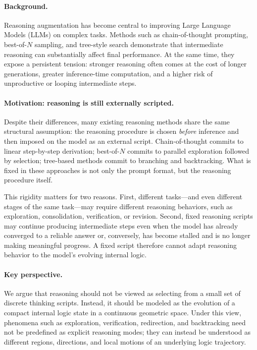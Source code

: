 \documentclass{article}
\begin{document}
\paragraph{Background.}
Reasoning augmentation has become central to improving Large Language Models (LLMs) on complex tasks. Methods such as chain-of-thought prompting, best-of-$N$ sampling, and tree-style search demonstrate that intermediate reasoning can substantially affect final performance. At the same time, they expose a persistent tension: stronger reasoning often comes at the cost of longer generations, greater inference-time computation, and a higher risk of unproductive or looping intermediate steps.

\paragraph{Motivation: reasoning is still externally scripted.}
Despite their differences, many existing reasoning methods share the same structural assumption: the reasoning procedure is chosen \emph{before} inference and then imposed on the model as an external script. Chain-of-thought commits to linear step-by-step derivation; best-of-$N$ commits to parallel exploration followed by selection; tree-based methods commit to branching and backtracking. What is fixed in these approaches is not only the prompt format, but the reasoning procedure itself.

This rigidity matters for two reasons. First, different tasks---and even different stages of the same task---may require different reasoning behaviors, such as exploration, consolidation, verification, or revision. Second, fixed reasoning scripts may continue producing intermediate steps even when the model has already converged to a reliable answer or, conversely, has become stalled and is no longer making meaningful progress. A fixed script therefore cannot adapt reasoning behavior to the model's evolving internal logic.

\paragraph{Key perspective.}
We argue that reasoning should not be viewed as selecting from a small set of discrete thinking scripts. Instead, it should be modeled as the evolution of a compact internal logic state in a continuous geometric space. Under this view, phenomena such as exploration, verification, redirection, and backtracking need not be predefined as explicit reasoning modes; they can instead be understood as different regions, directions, and local motions of an underlying logic trajectory.
\end{document}
